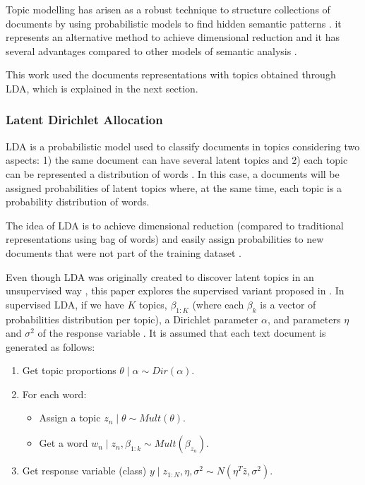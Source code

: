 \documentclass[preprint,12pt,3p]{elsarticle}
\begin{document}
Topic modelling has arisen as a robust technique to structure collections of documents by using probabilistic models to find hidden semantic patterns \cite{srivastava2009text}. it represents an alternative method to achieve dimensional reduction and it has several advantages compared to other models of semantic analysis \cite{aggarwal2015data}.\par

This work used the documents representations with topics obtained through LDA, which is explained in the next section.

\subsubsection{Latent Dirichlet Allocation}

LDA is a probabilistic model used to classify documents in topics considering two aspects: 1) the same document can have several latent topics and 2) each topic can be represented a distribution of words \cite{bae2014computing}. In this case, a documents will be assigned probabilities of latent topics where, at the same time, each topic is a probability distribution of words.\par

The idea of LDA is to achieve dimensional reduction (compared to traditional representations using bag of words) and easily assign probabilities to new documents that were not part of the training dataset \cite{aggarwal2015data}.\par

Even though LDA was originally created to discover latent topics in an unsupervised way \cite{blei2003latent}, this paper explores the supervised variant proposed in \cite{mcauliffe2008supervised}. In supervised LDA, if we have $K$ topics, ${\beta_{1:K}}$ (where each ${\beta_{k}}$ is a vector of probabilities distribution per topic), a Dirichlet parameter ${\alpha}$, and parameters $\eta$ and $\sigma^{2}$ of the response variable \cite{mcauliffe2008supervised}. It is assumed that each text document is generated as follows:

\begin{enumerate}
   \item Get topic proportions ${\theta \mid \alpha \sim Dir(\alpha)}$.
   \item For each word:
   \begin{itemize}
     \item Assign a topic ${z_n \mid \theta \sim Mult(\theta)}$.
     \item Get a word ${w_n \mid z_n,\beta_{1:k}  \sim Mult(\beta_{z_n})}$.
   \end{itemize}
   \item Get response variable (class) ${y \mid z_{1:N},\eta,\sigma^{2}  \sim N(\eta^{T}\bar{z},\sigma^{2})}$.
\end{enumerate} 
\end{document}
